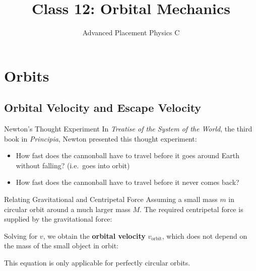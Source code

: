 \documentclass[12pt,compress,aspectratio=169]{beamer}
\title{Class 12: Orbital Mechanics}
\subtitle{Advanced Placement Physics C}
\begin{document}
\begin{frame}
  \maketitle
\end{frame}


\section{Orbits}

\subsection{Orbital Velocity and Escape Velocity}

\begin{frame}{Newton's Thought Experiment}
  In \emph{Treatise of the System of the World}, the third book in
  \emph{Principia}, Newton presented this thought experiment:
  \begin{center}
  \end{center}
  \begin{itemize}
  \item How fast does the cannonball have to travel before it goes around Earth
    without falling? (i.e.\ goes into orbit)
  \item How fast does the cannonball have to travel before it never comes back?
  \end{itemize}
\end{frame}



\begin{frame}{Relating Gravitational and Centripetal Force}
  Assuming a small mass $m$ in circular orbit around a much larger mass $M$.
  The required centripetal force is supplied by the gravitational force:
  

  \vspace{-.1in}Solving for $v$, we obtain the \textbf{orbital velocity}
  $v_\text{orbit}$, which does not depend on the mass of the small object in
  orbit:


  This equation is only applicable for perfectly circular orbits.
\end{frame}
\end{document}

